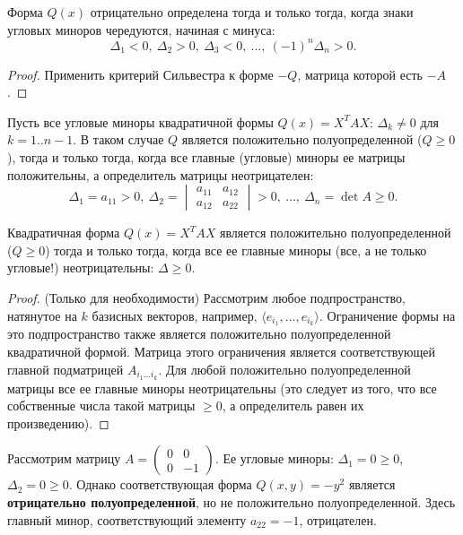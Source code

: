 \documentclass[12pt]{article}
\begin{document}
\begin{theorem}
Форма $Q(x)$ отрицательно определена тогда и только тогда, когда знаки угловых миноров чередуются, начиная с минуса:
\[
\Delta_1 < 0,\ \Delta_2 > 0,\ \Delta_3 < 0,\ \dots,\ (-1)^n \Delta_n > 0.
\]
\end{theorem}
\begin{proof}
Применить критерий Сильвестра к форме $-Q$, матрица которой есть $-A$.
\end{proof}

\begin{corollary}
Пусть все угловые миноры квадратичной формы $Q(x) = X^T A X$: $\Delta_k \neq 0$ для $k=1..n-1$. В таком случае $Q$ является положительно полуопределенной ($Q \ge 0$), тогда и только тогда, когда все главные (угловые) миноры ее матрицы положительны, а определитель матрицы неотрицателен:
\[
\Delta_1 = a_{11} > 0,\ \Delta_2 = \begin{vmatrix} a_{11} & a_{12} \\ a_{12} & a_{22} \end{vmatrix} > 0,\ \dots,\ \Delta_n = \det A \geq 0.
\]
\end{corollary}

\begin{theorem}
Квадратичная форма $Q(x) = X^T A X$ является положительно полуопределенной ($Q \ge 0$) тогда и только тогда, когда все ее главные миноры (все, а не только угловые!) неотрицательны: $\Delta \ge 0$.
\end{theorem}

\begin{proof}
(Только для необходимости) Рассмотрим любое подпространство, натянутое на $k$ базисных векторов, например, $\langle e_{i_1}, \dots, e_{i_k} \rangle$. Ограничение формы на это подпространство также является положительно полуопределенной квадратичной формой. Матрица этого ограничения является соответствующей главной подматрицей $A_{i_1 \dots i_k}$. Для любой положительно полуопределенной матрицы все ее главные миноры неотрицательны (это следует из того, что все собственные числа такой матрицы $\ge 0$, а определитель равен их произведению).
\end{proof}

\begin{example}[Контрпример]
Рассмотрим матрицу $A = \begin{pmatrix} 0 & 0 \\ 0 & -1 \end{pmatrix}$. Ее угловые миноры: $\Delta_1 = 0 \ge 0$, $\Delta_2 = 0 \ge 0$. Однако соответствующая форма $Q(x,y) = -y^2$ является \textbf{отрицательно полуопределенной}, но не положительно полуопределенной. Здесь главный минор, соответствующий элементу $a_{22} = -1$, отрицателен.
\end{example}
\end{document}
